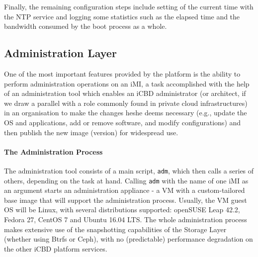 Finally, the remaining configuration steps include setting of the current time with the NTP service and logging some statistics such as the elapsed time and the bandwidth consumed by the boot process as a whole.



\subsection{Administration Layer}
\label{sub:icbd_adm_layer}

One of the most important features provided by the platform is the ability to perform administration operations on an iMI, a task accomplished with the help of an administration tool which enables an iCBD administrator (or architect, if we draw a parallel with a role commonly found in private cloud infrastructures) in an organisation to make the changes he\/she deems necessary (e.g., update the OS and applications, add or remove software, and modify configurations) and then publish the new image (version) for widespread use.




\paragraph{The Administration Process}
\label{par:admin_imi}

The administration tool consists of a main script, \texttt{adm}, which then calls a series of others, depending on the task at hand. Calling \texttt{adm} with the name of one iMI as an argument starts an administration appliance - a VM with a custom-tailored base image that will support the administration process. Usually, the VM guest OS will be Linux, with several distributions supported: openSUSE Leap 42.2, Fedora 27, CentOS 7 and Ubuntu 16.04 LTS. The whole administration process makes extensive use of the snapshotting capabilities of the Storage Layer (whether using Btrfs or Ceph), with no (predictable) performance degradation on the other iCBD platform services.

